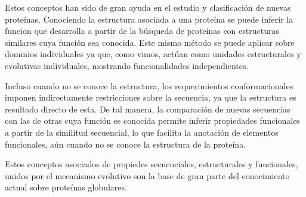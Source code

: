 Estos conceptos han sido de gran ayuda en el estudio y clasificación de nuevas proteínas. 
Conociendo la estructura asociada a una proteína se puede inferir la funcion que desarrolla a partir de la búsqueda de proteínas con estructuras similares cuya función sea conocida.
Este mismo método se puede aplicar sobre dominios individuales ya que, como vimos, actúan como unidades estructurales y evolutivas individuales, mostrando funcionalidades independientes.

Incluso cuando no se conoce la estructura, los requerimientos conformacionales imponen indirectamente restricciones sobre la secuencia, ya que la estructura es resultado directo de esta.
De tal manera, la comparación de nuevas secuencias con las de otras cuya función es conocida permite inferir propiedades funcionales a partir de la similitud secuencial, 
lo que facilita la anotación de elementos funcionales, aún cuando no se conoce la estructura de la proteína.

Estos conceptos asociados de propiedes secuenciales, estructurales y funcionales, unidos por el mecanismo evolutivo son la base de gran parte del conocimiento actual sobre proteínas globulares.

% 






